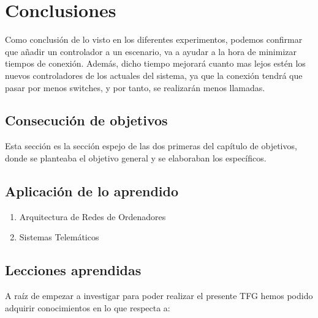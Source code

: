 \documentclass[a4paper, 12pt]{book}
\begin{document}
	\clearpage
	\chapter{Conclusiones}
	\label{chap:conclusiones}
	
	Como conclusión de lo visto en los diferentes experimentos, podemos confirmar que añadir un controlador a un escenario, va a ayudar a la hora de minimizar tiempos de conexión. Además, dicho tiempo mejorará cuanto mas lejos estén los nuevos controladores de los actuales del sistema, ya que la conexión tendrá que pasar por menos switches, y por tanto, se realizarán menos llamadas.
	
	\section{Consecución de objetivos}
	\label{sec:consecucion-objetivos}
	
	Esta sección es la sección espejo de las dos primeras del capítulo de objetivos, donde se planteaba el objetivo general y se elaboraban los específicos.
	
	\section{Aplicación de lo aprendido}
	\label{sec:aplicacion}
	
	\begin{enumerate}
		\item Arquitectura de Redes de Ordenadores
		\item Sistemas Telemáticos
	\end{enumerate}
	
	
	\section{Lecciones aprendidas}
	\label{sec:lecciones_aprendidas}
	
	A raíz de empezar a investigar para poder realizar el presente TFG hemos podido adquirir conocimientos en lo que respecta a:
	
\end{document}
